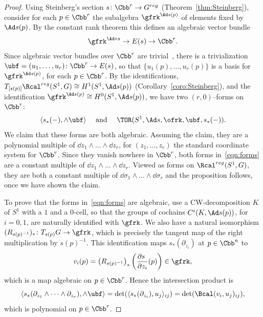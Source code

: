 \begin{proof}
Using Steinberg's section $s\colon \Cbb^r\to G^{reg}$ (Theorem~\ref{thm:Steinberg}), consider for each $p\in\Cbb^r$ the subalgebra $\gfrk^{\Ad s(p) }$ of elements fixed by $ {\Ad s(p)} $. By the constant rank theorem this defines an algebraic vector bundle
\[
\gfrk^{\Ad\circ s} \to E(s)\to \Cbb^r.
\]
Since algebraic vector bundles over $\Cbb^r$ are trivial~\cite{Quillen,Suslin}, there is a trivialization $\ubf=(u_1,\dots,u_r)\colon \Cbb^r\to E(s)$, so that $\{ u_1(p),\dots,u_r(p)\}$ is a basis for $\gfrk^{\Ad s(p)}$, for each $p\in\Cbb^r$. By the identifications, $ T_{[s(p)]}\Rcal^ {reg}(S^ 1, G) \cong H^1(S^1,\Ad s(p))$ (Corollary~\ref{coro:Steinberg}), and the identification $\gfrk^{\Ad s(p)} \cong H^0(S^1,\Ad s(p)) $, we have two $(r,0)$--forms on $\Cbb^r$:
\begin{equation}\label{eqn:forms}
\langle s_*(-), \wedge \ubf \rangle \quad\text{ and } \quad
\TOR(S^1,\Ad s, \ofrk, \ubf,s_*(-)).
\end{equation}
We claim that these forms are both algebraic. Assuming the claim, they are a polynomial multiple of $\dd z_1\wedge\dots\wedge \dd z_r$, for $(z_1,\dots,z_r)$ the standard coordinate system for $\Cbb^r$. Since they vanish nowhere in $\Cbb^r$, both forms in~\eqref{eqn:forms} are a constant multiple of $\dd z_1\wedge\dots\wedge \dd z_r$. Viewed as forms on $\Rcal^{reg}(S^1, G)$, they are both a constant multiple of $\dd\sigma_1\wedge\dots \wedge \dd\sigma_r$ and the proposition follows, once we have shown the claim.


To prove that the forms in~\eqref{eqn:forms} are algebraic, use a CW-decomposition $K$ of $S^1$ with a $1$ and a $0$-cell, so that the groups of cochains $C^i(K,\Ad s(p))$, for $i=0,1$, are naturally identified with $\gfrk$. We also have a natural isomorphism $
(R_{s(p)^{-1}})_*\colon T_{s(p)} G\to \gfrk$, which is precisely the tangent map of the right multiplication by $s(p)^{-1} $. This identification maps $s_*(\partial_{z_i})$ at $p\in\Cbb^n$ to
\[
v_i(p) = \left(R_{ s(p)^{-1}}\right)_* \left(\frac{\partial s_{\phantom{i}}}{\partial {z_i}}(p) \right) \in\gfrk,
\]
which is a map algebraic on $p\in\Cbb^r$. Hence the intersection product is
\[
\langle s_*(\partial_{z_1}\wedge\dots\wedge \partial_{z_r}),\wedge \ubf \rangle=
\det (\langle s_*(\partial_{z_i}), u_j\rangle_{ij})= \det(\Bcal(v_i, u_j)_{ij}),
\]
which is polynomial on $p\in\Cbb^r$.


\end{proof}
